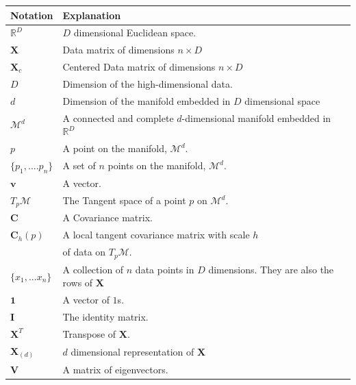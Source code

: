 \documentclass[12pt]{report}
\begin{document}
\begin{table}[ht]
\begin{tabular}{|l|l|}
\hline
\textbf{Notation} & \textbf{Explanation}                                      \\ \hline
$\mathbb{R}^D$    & $D$ dimensional Euclidean space.                      \\ \hline
$\mathbf{X}$        & Data matrix of dimensions $n \times D$               \\ \hline
$\mathbf{X}_c$        & Centered Data matrix of dimensions $n \times D$                \\ \hline
$D$                & Dimension of the high-dimensional data.                \\ \hline
$d$               & Dimension of the manifold embedded in $D$ dimensional space \\ \hline
$\mathcal{M}^d$    & A connected and complete $d$-dimensional manifold
                   embedded in $\mathbb{R}^D$                                 \\ \hline
$p$               & A point on the manifold, $\mathcal{M}^d$.            \\ \hline
$\{p_1,....p_n\}$ & A set of $n$ points on the manifold, $\mathcal{M}^d$.            \\ \hline
$\mathbf{v}$        & A vector.                                         \\ \hline
$T_p\mathcal{M}$    & The Tangent space of a point $p$ on $\mathcal{M}^d$.   \\ \hline
$\mathbf{C}$        & A Covariance matrix.                               \\ \hline
$\mathbf{C}_h(p)$   & A local tangent covariance matrix with scale $h$ 
\\ & of data on $T_p\mathcal{M}$.    \\ \hline
$\{x_1,...x_n\}$  & A collection of $n$ data points in $D$ dimensions. 
They are also the rows of $\mathbf{X}$  \\ \hline
$\mathbf{1}$      & A vector of $1$s.                                   \\ \hline
$\mathbf{I}$      & The identity matrix.                               \\ \hline
$\mathbf{X}^T$    & Transpose of $\mathbf{X}$.                          \\ \hline
$\mathbf{X}_{(d)}$ & $d$ dimensional representation of $\mathbf{X}$      \\ \hline
$\mathbf{V}$    & A matrix of eigenvectors. 

\end{tabular}
\end{table}
\end{document}
